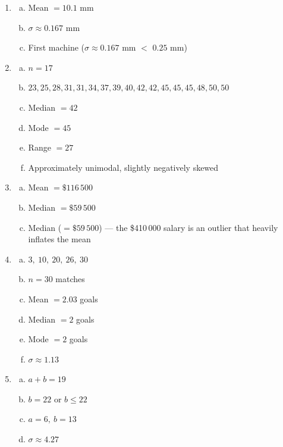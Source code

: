 \documentclass{article}
\begin{document}
\begin{enumerate}
  \item
  \begin{enumerate}[(a)]
    \item Mean $= 10.1$ mm
    \item $\sigma \approx 0.167$ mm
    \item First machine ($\sigma \approx 0.167$ mm $<$ $0.25$ mm)
  \end{enumerate}

  \item
  \begin{enumerate}[(a)]
    \item $n = 17$
    \item $23, 25, 28, 31, 31, 34, 37, 39, 40, 42, 42, 45, 45, 45, 48, 50, 50$
    \item Median $= 42$
    \item Mode $= 45$
    \item Range $= 27$
    \item Approximately unimodal, slightly negatively skewed
  \end{enumerate}

  \item
  \begin{enumerate}[(a)]
    \item Mean $= \$116\,500$
    \item Median $= \$59\,500$
    \item[(c--d)] Median ($= \$59\,500$) --- the \$410\,000 salary is an outlier that heavily inflates the mean
  \end{enumerate}

  \item
  \begin{enumerate}[(a)]
    \item $3,\ 10,\ 20,\ 26,\ 30$
    \item $n = 30$ matches
    \item Mean $= 2.03$ goals
    \item Median $= 2$ goals
    \item Mode $= 2$ goals
    \item $\sigma \approx 1.13$
  \end{enumerate}

  \item
  \begin{enumerate}[(a)]
    \item $a + b = 19$
    \item $b = 22$ or $b \leq 22$
    \item $a = 6,\ b = 13$
    \item $\sigma \approx 4.27$
  \end{enumerate}

\end{enumerate}
\end{document}
